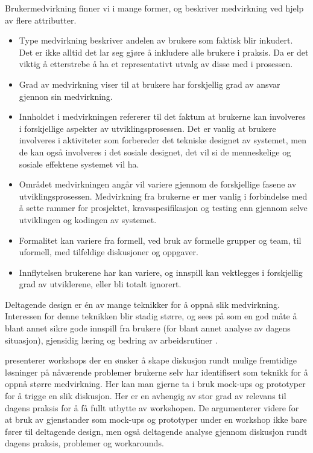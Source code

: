 \noindent
Brukermedvirkning finner vi i mange former, og \citet{Cavaye95} beskriver medvirkning ved hjelp av flere attributter. 

\begin{itemize}
\item Type medvirkning beskriver andelen av brukere som faktisk blir inkudert. Det er ikke alltid det lar seg gjøre å inkludere alle brukere i praksis. Da er det viktig å etterstrebe å ha et representativt utvalg av disse med i prosessen.
\item Grad av medvirkning viser til at brukere har forskjellig grad av ansvar gjennon sin medvirkning.
\item Innholdet i medvirkningen refererer til det faktum at brukerne kan involveres i forskjellige aspekter av utviklingsprosessen. Det er vanlig at brukere involveres i aktiviteter som forbereder det tekniske designet av systemet, men de kan også involveres i det sosiale designet, det vil si de menneskelige og sosiale effektene systemet vil ha.
\item Området medvirkningen angår vil variere gjennom de forskjellige fasene av utviklingsprosessen. Medvirkning fra brukerne er mer vanlig i forbindelse med å sette rammer for prosjektet, kravsspesifikasjon og testing enn gjennom selve utviklingen og kodingen av systemet.
\item Formalitet kan variere fra formell, ved bruk av formelle grupper og team, til uformell, med tilfeldige diskusjoner og oppgaver.
\item Innflytelsen brukerene har kan variere, og innspill kan vektlegges i forskjellig grad av utviklerene, eller bli totalt ignorert.
\end{itemize}

\noindent
Deltagende design er én av mange teknikker for å oppnå slik medvirkning.
Interessen for denne teknikken blir stadig større, og sees på som en god måte å blant annet sikre gode innspill fra brukere (for blant annet analyse av dagens situasjon), gjensidig læring og bedring av arbeidsrutiner \citep{Mogensen92}.

\noindent
\citet{Mogensen92} presenterer workshops der en ønsker å skape diskusjon rundt mulige fremtidige løsninger på nåværende problemer brukerne selv har identifisert som teknikk for å oppnå større medvirkning. Her kan man gjerne ta i bruk mock-ups og prototyper for å trigge en slik diskusjon. Her er en avhengig av stor grad av relevans til dagens praksis for å få fullt utbytte av workshopen. De argumenterer videre for at bruk av gjenstander som mock-ups og prototyper under en workshop ikke bare fører til deltagende design, men også deltagende analyse gjennom diskusjon rundt dagens praksis, problemer og workarounds.